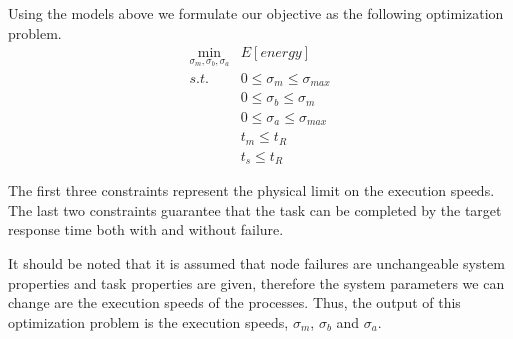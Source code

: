 Using the models above we formulate our objective as the following
optimization problem.
\begin{equation}
\label{optimization_problem}
\begin{alignedat}{2}
\min_{\sigma_m,\sigma_b,\sigma_a}     & E[energy] \\
	s.t.							 & 0 \leq \sigma_m \leq \sigma_{max} \\
                                     & 0 \leq \sigma_b \leq \sigma_{m} \\
                                     & 0 \leq \sigma_a \leq \sigma_{max} \\
									 & t_m \leq t_R \\
									 & t_s \leq t_R	                                  
\end{alignedat}
\end{equation}

The first three constraints represent the physical limit on the execution speeds. 
The last two constraints guarantee that the task can be completed by the target 
response time both with and without failure.

It should be noted that it is assumed that node failures are unchangeable 
system properties and task
properties are given, therefore the system
parameters we can change are the execution speeds of the
processes. Thus, the output of this optimization problem is the
execution speeds, $\sigma_m$, $\sigma_b$ and $\sigma_a$. 

